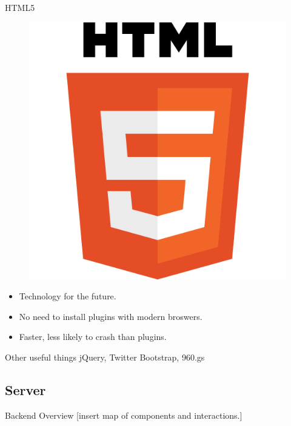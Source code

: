 \documentclass{beamer}
\begin{document}
\begin{frame}{HTML5}
  \begin{figure}[HTML5]
    \centering
    \includegraphics[scale=0.25]{HTML5_Logo_512.png}
  \end{figure}
  \begin{itemize}
    \item Technology for the future.
    \vspace{\baselineskip}
    \item No need to install plugins with modern broswers.
    \vspace{\baselineskip}
    \item Faster, less likely to crash than plugins.
  \end{itemize}
\end{frame}

\begin{frame}{Other useful things}
  jQuery, Twitter Bootstrap, 960.gs
\end{frame}

\subsection{Server}

\begin{frame}{Backend Overview}
  [insert map of components and interactions.]
\end{frame}
\end{document}

